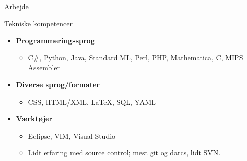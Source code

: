 \documentclass[11pt,oneside,a4paper]{article}
\newenvironment{ressection}[1]{
	\vspace{4pt}
	{\fontfamily{phv}\selectfont\Large#1}
	\begin{itemize}
	\vspace{3pt}
}{
	\end{itemize}
}
\newcommand{\resitem}[1]{
	\vspace{-4pt}
	\item \begin{flushleft} #1 \end{flushleft}
}
\newcommand{\ressubitem}[1]{
	\vspace{-1pt}
	\item \begin{flushleft} #1 \end{flushleft}
}
\newcommand{\resbigitem}[3]{
	\vspace{-5pt}
	\item
	\textbf{#1}---#2 \\
	\textit{#3}
}
\newenvironment{ressubsec}[3]{
	\resbigitem{#1}{#2}{#3}
	\vspace{-2pt}
	\begin{itemize}
}{
	\end{itemize}
}
\newenvironment{reslist}[1]{
	\resitem{\textbf{#1}}
	\vspace{-2pt}
	\begin{itemize}
}{
	\end{itemize}
}
\begin{document}
\begin{ressection}{Arbejde}
%
%
%

\end{ressection}


\begin{ressection}{Tekniske kompetencer}
	\begin{reslist}{Programmeringssprog}
		\resitem{C\#, Python, Java, Standard ML, Perl, PHP, Mathematica, C, MIPS Assembler}
	\end{reslist}
	
	\begin{reslist}{Diverse sprog/formater}
		\resitem{CSS, HTML/XML, \LaTeX, SQL, YAML}
	\end{reslist}

    \begin{reslist}{Værktøjer}
		\resitem{Eclipse, VIM, Visual Studio}
		\resitem{Lidt erfaring med source control; mest git og darcs, lidt SVN.}
	\end{reslist}
\end{ressection}
\end{document}
